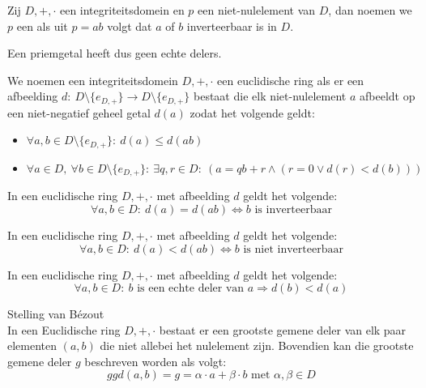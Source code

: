 \documentclass[main.tex]{subfiles}
\begin{document}
\begin{de}
  Zij $D,+,\cdot$ een integriteitsdomein en $p$ een niet-nulelement van $D$, dan noemen we $p$ een  als uit $p=ab$ volgt dat $a$ of $b$ inverteerbaar is in $D$.
\end{de}

\begin{opm}
  Een priemgetal heeft dus geen echte delers.
\end{opm}

\begin{de}
  We noemen een integriteitsdomein $D,+,\cdot$ een euclidische ring als er een afbeelding $d:\ D\setminus \{e_{D,+}\} \rightarrow D \setminus \{e_{D,+}\}$ bestaat die elk niet-nulelement $a$ afbeeldt op een niet-negatief geheel getal $d(a)$ zodat het volgende geldt:
\begin{itemize}
\item $\forall a,b \in D\setminus \{e_{D,+}\}:\ d(a) \le d(ab)$
\item $\forall a \in D,\ \forall b\in D\setminus \{e_{D,+}\}:\ \exists q,r \in D:\ (a = qb+r \wedge (r=0 \vee d(r) < d(b)))$
\end{itemize}
\end{de}

\begin{st}
  In een euclidische ring $D,+,\cdot$ met afbeelding $d$ geldt het volgende:
  \[ \forall a,b \in D:\ d(a) = d(ab) \Leftrightarrow b \text{ is inverteerbaar} \]
\end{st}

\begin{st}
  In een euclidische ring $D,+,\cdot$ met afbeelding $d$ geldt het volgende:
  \[ \forall a,b \in D:\ d(a) < d(ab) \Leftrightarrow b \text{ is niet inverteerbaar} \]
\end{st}

\begin{st}
  In een euclidische ring $D,+,\cdot$ met afbeelding $d$ geldt het volgende:
  \[ \forall a,b \in D:\ b \text{ is een echte deler van } a \Rightarrow d(b) < d(a) \]
\end{st}

\begin{st}
  Stelling van B\'ezout\\
  In een Euclidische ring $D,+,\cdot$ bestaat er een grootste gemene deler van elk paar elementen $(a,b)$ die niet allebei het nulelement zijn.
  Bovendien kan die grootste gemene deler $g$ beschreven worden als volgt:
  \[ ggd(a,b) = g = \alpha \cdot a + \beta \cdot b \text{ met }\alpha,\beta \in D \]
\end{st}
\end{document}
